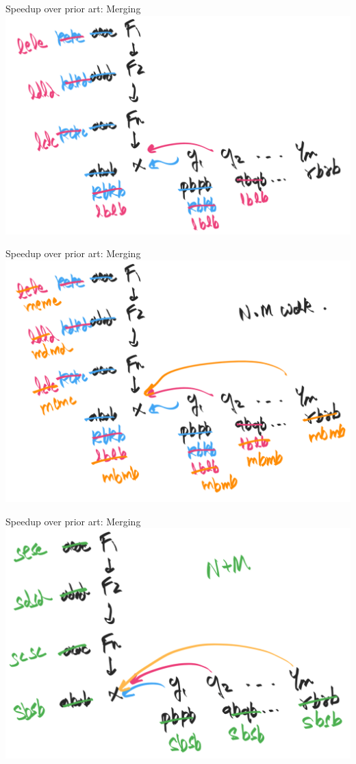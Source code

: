 \documentclass[8pt]{beamer}
\begin{document}
\begin{frame}[fragile]{Speedup over prior art: Merging}
\includegraphics[width=\textwidth]{./eg-2-3.png}
\end{frame}

\begin{frame}[fragile]{Speedup over prior art: Merging}
\includegraphics[width=\textwidth]{./eg-2-4.png}
\end{frame}


\begin{frame}[fragile]{Speedup over prior art: Merging}
\includegraphics[width=\textwidth]{./eg-2-5.png}
\end{frame}
\end{document}
